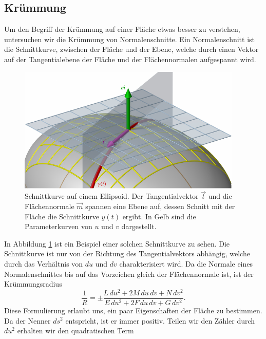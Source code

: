 \subsection{Krümmung}
Um den Begriff der Krümmung auf einer Fläche etwas besser zu verstehen,
untersuchen wir die Krümmung von Normalenschnitte.
Ein Normalenschnitt ist die Schnittkurve, zwischen der Fläche und der Ebene, welche durch einen Vektor auf 
der Tangentialebene der Fläche und der Flächennormalen aufgespannt wird.
\begin{figure}
  \begin{center}
    \includegraphics[width=0.95\textwidth]{papers/mongeampere/images/schnittkurven.pdf}
  \end{center}
  \caption{Schnittkurve auf einem Ellipsoid. Der Tangentialvektor $\vec t$ und die Flächennormale $\vec m$ spannen eine Ebene auf, 
  dessen Schnitt mit der Fläche die Schnittkurve $y(t)$ ergibt. In Gelb sind die Parameterkurven von $u$ und $v$ dargestellt.}\label{mongeampere:fig:schnitt}
\end{figure}
In Abbildung \ref{mongeampere:fig:schnitt} ist ein Beispiel einer solchen Schnittkurve zu sehen.
Die Schnittkurve ist nur von der Richtung des Tangentialvektors abhängig, welche durch das Verhältnis von $d u$ und $d v$ charakterisiert wird.
Da die Normale eines Normalenschnittes bis auf das Vorzeichen gleich der Flächennormale ist, ist der 
Krümmungsradius
\begin{equation}
  \frac{1}{R} = \pm \frac{L \,d u^2 + 2 M \,d u\,d v + N \,d v^2}
                  {E \,d u^2 + 2F \,d u \, d v + G\,d v^2}.
  \label{mongeampere:normkrum}
\end{equation}
Diese Formulierung erlaubt uns, ein paar Eigenschaften der Fläche zu bestimmen.
Da der Nenner $d s^2$ entspricht, ist er immer positiv. 
Teilen wir den Zähler durch $d u^2$ erhalten wir den quadratischen Term
